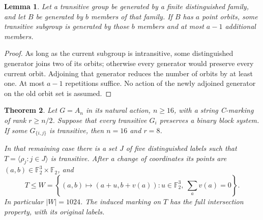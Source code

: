 \documentclass[11pt,a4paper]{article}
\newtheorem{lemma}{Lemma}
\newtheorem{theorem}[lemma]{Theorem}
\newcommand{\gen}[1]{\langle #1\rangle}
\begin{document}
\begin{lemma}\label{growth}
Let a transitive group be generated by a finite distinguished
family, and let $B$ be generated by $b$ members of that family.
If $B$ has $a$ point orbits, some transitive subgroup is generated
by those $b$ members and at most $a-1$ additional members.
\end{lemma}
\begin{proof}
As long as the current subgroup is intransitive, some distinguished
generator joins two of its orbits; otherwise every generator would
preserve every current orbit. Adjoining that generator reduces the
number of orbits by at least one. At most $a-1$ repetitions suffice.
No action of the newly adjoined generator on the old orbit set is
assumed.
\end{proof}

\begin{theorem}\label{reduction}
Let $G=A_n$ in its natural action, $n\ge16$, with a string
C-marking of rank $r\ge n/2$. Suppose that every transitive
$G_i$ preserves a binary block system. If some $G_{\{i,j\}}$
is transitive, then $n=16$ and $r=8$.

In that remaining case there is a set $J$ of five distinguished
labels such that $T=\gen{\rho_j:j\in J}$ is transitive. After a
change of coordinates its points are $(a,b)\in\mathbb F_2^3
\times\mathbb F_2$, and
\[
 T\le W=\left\{(a,b)\longmapsto(a+u,b+v(a)):
 u\in\mathbb F_2^3,\ \sum_a v(a)=0\right\}.
                                                        \tag{1}
\]
In particular $|W|=1024$. The induced marking on $T$ has the
full intersection property, with its original labels.
\end{theorem}
\end{document}
